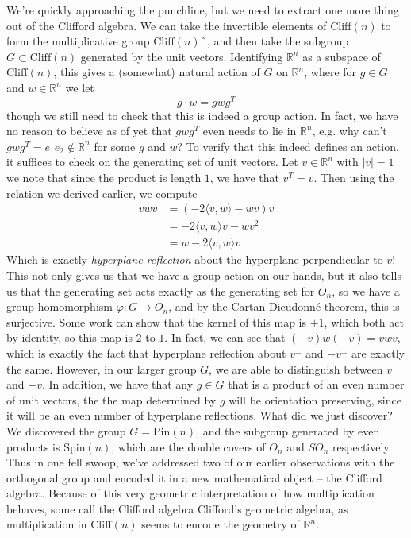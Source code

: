 \documentclass{article}
\newcommand{\R}{\mathbb{R}}
\begin{document}
We're quickly approaching the punchline, but we need to extract one more thing out of the Clifford algebra. We can take the invertible elements of $\mathrm{Cliff}(n)$ to form the multiplicative group $\mathrm{Cliff}(n)^\times$, and then take the subgroup $G \subset \mathrm{Cliff}(n)$ generated by the unit vectors. Identifying $\R^n$ as a subspace of $\mathrm{Cliff}(n)$, this gives a (somewhat) natural action of $G$ on $\R^n$, where for $g \in G$ and $w \in \R^n$ we let 
$$g\cdot w = gwg^T $$
though we still need to check that this is indeed a group action. In fact, we have no reason to believe as of yet that $gwg^T$ even needs to lie in $\R^n$, e.g. why can't $gwg^T = e_1e_2 \notin \R^n$ for some $g$ and $w$? To verify that this indeed defines an action, it suffices to check on the generating set of unit vectors. Let $v \in \R^n$ with $|v| = 1$ we note that since the product is length $1$, we have that $v^T = v$. Then using the relation we derived earlier, we compute
\begin{align*}
vwv &= (-2 \langle v,w \rangle - wv)v \\
&= -2\langle v,w \rangle v -wv^2 \\
&= w - 2\langle v,w \rangle v
\end{align*}
Which is exactly \emph{hyperplane reflection} about the hyperplane perpendicular to $v$! This not only gives us that we have a group action on our hands, but it also tells us that the generating set acts exactly as the generating set for $O_n$, so we have a group homomorphism $\varphi : G \to O_n$, and by the Cartan-Dieudonn\'e theorem, this is surjective. Some work can show that the kernel of this map is $\pm 1$, which both act by identity, so this map is $2$ to $1$. In fact, we can see that $(-v)w(-v) = vwv$, which is exactly the fact that hyperplane reflection about $v^\perp$ and $-v^\perp$ are exactly the same. However, in our larger group $G$, we are able to distinguish between $v$ and $-v$. In addition, we have that any $g \in G$ that is a product of an even number of unit vectors, the the map determined by $g$ will be orientation preserving, since it will be an even number of hyperplane reflections. What did we just discover? We discovered the group $G = \mathrm{Pin}(n)$, and the subgroup generated by even products is $\mathrm{Spin}(n)$, which are the double covers of $O_n$ and $SO_n$ respectively. Thus in one fell swoop, we've addressed two of our earlier observations with the orthogonal group and encoded it in a new mathematical object -- the Clifford algebra. Because of this very geometric interpretation of how multiplication behaves, some call the Clifford algebra Clifford's geometric algebra, as multiplication in $\mathrm{Cliff}(n)$ seems to encode the geometry of $\R^n$.
\end{document}
